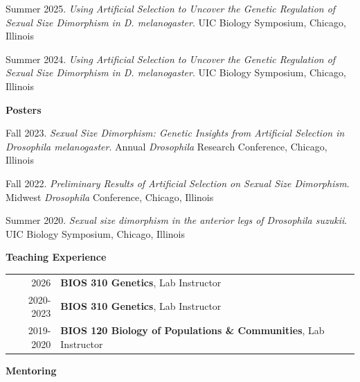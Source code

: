 \documentclass[12pt,reqno,oneside]{report}
\begin{document}
\hangindent=1cm
Summer 2025. \textit{Using Artificial Selection to Uncover the Genetic Regulation of Sexual Size Dimorphism in D. melanogaster}. UIC Biology Symposium, Chicago, Illinois

\vspace{0.25cm}

\hangindent=1cm
Summer 2024. \textit{Using Artificial Selection to Uncover the Genetic Regulation of Sexual Size Dimorphism in D. melanogaster}. UIC Biology Symposium, Chicago, Illinois

\vspace{0.5cm}

\textbf{Posters}

\vspace{0.25cm}

\hangindent=1cm
Fall 2023. \textit{Sexual Size Dimorphism: Genetic Insights from Artificial Selection in Drosophila melanogaster}. Annual \textit{Drosophila} Research Conference, Chicago, Illinois

\vspace{0.25cm}

\hangindent=1cm
Fall 2022. \textit{Preliminary Results of Artificial Selection on Sexual Size Dimorphism}. Midwest \textit{Drosophila} Conference, Chicago, Illinois

\vspace{0.25cm}

\hangindent=1cm
Summer 2020. \textit{Sexual size dimorphism in the anterior legs of Drosophila suzukii}. UIC Biology Symposium, Chicago, Illinois

\clearpage

{\Large\textbf{Teaching Experience}}\hrulefill\\

\begin{table}[h]
    \raggedright
    \begin{tabular}{rl}
        2026 & \textbf{BIOS 310 Genetics}, Lab Instructor\\
        2020-2023 & \textbf{BIOS 310 Genetics}, Lab Instructor\\
        2019-2020 & \textbf{BIOS 120 Biology of Populations \& Communities}, Lab Instructor
    \end{tabular}
\end{table}

{\Large\textbf{Mentoring}}\hrulefill\\
\end{document}

